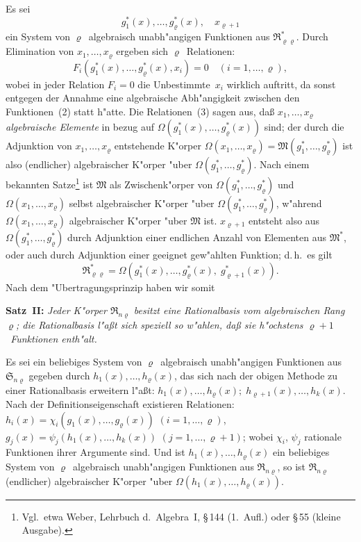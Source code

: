 \documentclass[11pt,a4paper]{article}
\begin{document}
Es sei
\begin{equation}
g_{1}^{*}(x),\dots,g_{\varrho}^{*}(x),\quad x_{\varrho+1}
\tag{2}
\end{equation}
ein System von $\varrho$~algebraisch unabh"{a}ngigen Funktionen aus $\mathfrak{R}_{\varrho\varrho}^{*}$.
Durch Elimination von $x_{1},\dots,x_{\varrho}$ ergeben sich $\varrho$~Relationen:
\begin{equation}
F_{i}(g_{1}^{*}(x),\dots,g_{\varrho}^{*}(x),x_{i})=0\quad(i=1,\dots,\varrho),
\tag{3}
\end{equation}
wobei in jeder Relation $F_{i}=0$ die Unbestimmte~$x_{i}$ wirklich auftritt, da
sonst entgegen der Annahme eine algebraische Abh"{a}ngigkeit zwischen den
Funktionen~(2) statt h"{a}tte. Die Relationen~(3) sagen aus, da\ss{} $x_{1},\dots,x_{\varrho}$
\emph{algebraische Elemente} in bezug auf $\Omega(g_{1}^{*}(x),\dots,g_{\varrho}^{*}(x))$ sind; der durch
die Adjunktion von $x_{1},\dots,x_{\varrho}$ entstehende K"{o}rper
$\Omega(x_{1},\dots,x_{\varrho})=\mathfrak{M}(g_{1}^{*},\dots,g_{\varrho}^{*})$
ist also (endlicher) algebraischer K"{o}rper "{u}ber $\Omega(g_{1}^{*},\dots,g_{\varrho}^{*})$.
Nach einem bekannten Satze\footnote{Vgl.\ etwa Weber, Lehrbuch d.\ Algebra~I,
\S\,144 (1.\ Aufl.) oder \S\,55 (kleine Ausgabe).} ist $\mathfrak{M}$ als Zwischenk"{o}rper von
$\Omega(g_{1}^{*},\dots,g_{\varrho}^{*})$ und $\Omega(x_{1},\dots,x_{\varrho})$ selbst algebraischer K"{o}rper "{u}ber
$\Omega(g_{1}^{*},\dots,g_{\varrho}^{*})$, w"{a}hrend $\Omega(x_{1},\dots,x_{\varrho})$ algebraischer K"{o}rper "{u}ber $\mathfrak{M}$ ist.
$x_{\varrho+1}$ entsteht also aus $\Omega(g_{1}^{*},\dots,g_{\varrho}^{*})$ durch Adjunktion einer endlichen
Anzahl von Elementen aus $\mathfrak{M}^{*}$, oder auch durch Adjunktion einer geeignet
gew"{a}hlten Funktion; d.\,h.\ es gilt
\[\mathfrak{R}_{\varrho\varrho}^{*}=\Omega(g_{1}^{*}(x),\dots,g_{\varrho}^{*}(x),\;g_{\varrho+1}^{*}(x)).\]
Nach dem "{U}bertragungsprinzip haben wir somit

\medskip
\noindent
\textbf{Satz~II:} \emph{Jeder K"{o}rper $\mathfrak{R}_{n\varrho}$ besitzt eine Rationalbasis vom
algebraischen Rang~$\varrho$; die Rationalbasis l"{a}\ss{}t sich speziell so w"{a}hlen,
da\ss{} sie h"{o}chstens $\varrho+1$~Funktionen enth"{a}lt.}

Es sei ein beliebiges System von $\varrho$~algebraisch unabh"{a}ngigen Funktionen
aus $\mathfrak{S}_{n\varrho}$ gegeben durch $h_{1}(x),\dots,h_{\varrho}(x)$, das sich nach der obigen Methode
zu einer Rationalbasis erweitern l"{a}\ss{}t:
$h_{1}(x),\dots,h_{\varrho}(x);\;h_{\varrho+1}(x),\dots,h_{k}(x)$.
Nach der Definitionseigenschaft existieren Relationen:
$h_{i}(x)=\chi_{i}(g_{1}(x),\dots,g_{\varrho}(x))$ $(i=1,\dots,\varrho)$,
$g_{j}(x)=\psi_{j}(h_{1}(x),\dots,h_{k}(x))$ $(j=1,\dots,\varrho+1)$;
wobei $\chi_{i}$, $\psi_{j}$ rationale Funktionen ihrer Argumente sind.
Und ist
$h_{1}(x),\dots,h_{\varrho}(x)$ ein beliebiges System von $\varrho$~algebraisch
unabh"{a}ngigen Funktionen aus $\mathfrak{R}_{n\varrho}$, so ist $\mathfrak{R}_{n\varrho}$ (endlicher) algebraischer
K"{o}rper "{u}ber $\Omega(h_{1}(x),\dots,h_{\varrho}(x))$.
\end{document}
